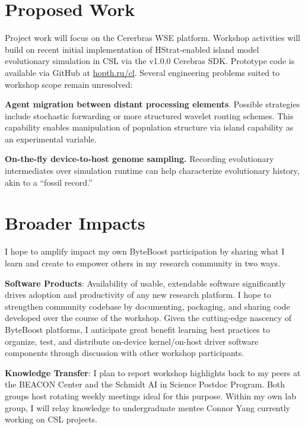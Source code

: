 \section{Proposed Work}

Project work will focus on the Cererbras WSE platform.
Workshop activities will build on recent initial implementation of HStrat-enabled island model evolutionary simulation in CSL via the v1.0.0 Cerebras SDK.
Prototype code is available via GitHub at \url{hopth.ru/cl}.
Several engineering problems suited to workshop scope remain unresolved:
\begin{enumerate*}
\item \textbf{Agent migration between distant processing elements}.
Possible strategies include stochastic forwarding or more structured wavelet routing schemes.
This capability enables manipulation of population structure via island capability as an experimental variable.

\item \textbf{On-the-fly device-to-host genome sampling.}
Recording evolutionary intermediates over simulation runtime can help characterize evolutionary history, akin to a ``fossil record.''
\end{enumerate*}

\section{Broader Impacts}

I hope to amplify impact my own ByteBoost participation by sharing what I learn and create to empower others in my research community in two ways.
\begin{enumerate*}
\item \textbf{Software Products}: Availability of usable, extendable software significantly drives adoption and productivity of any new research platform.
I hope to strengthen community codebase by documenting, packaging, and sharing code developed over the course of the workshop.
Given the cutting-edge nascency of ByteBoost platforms, I anticipate great benefit learning best practices to organize, test, and distribute on-device kernel/on-host driver software components through discussion with other workshop participants.
\item \textbf{Knowledge Transfer}: I plan to report workshop highlights back to my peers at the BEACON Center and the Schmidt AI in Science Postdoc Program.
Both groups host rotating weekly meetings ideal for this purpose.
Within my own lab group, I will relay knowledge to undergraduate mentee Connor Yang currently working on CSL projects.
\end{enumerate*}

